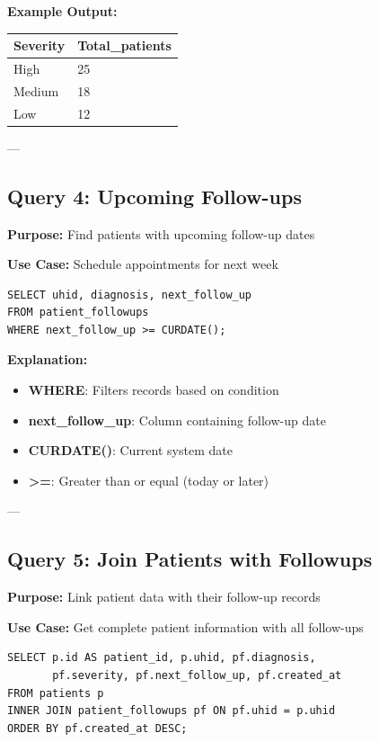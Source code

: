 \documentclass[12pt,a4paper]{article}
\begin{document}
\textbf{Example Output:}
\begin{table}[h]
\centering
\begin{tabular}{|l|l|}
\hline
\textbf{Severity} & \textbf{Total\_patients} \\
\hline
High & 25 \\
Medium & 18 \\
Low & 12 \\
\hline
\end{tabular}
\end{table}

---

\subsection{Query 4: Upcoming Follow-ups}

\textbf{Purpose:} Find patients with upcoming follow-up dates

\textbf{Use Case:} Schedule appointments for next week

\begin{lstlisting}[caption={Upcoming Patient Followups}]
SELECT uhid, diagnosis, next_follow_up
FROM patient_followups
WHERE next_follow_up >= CURDATE();
\end{lstlisting}

\textbf{Explanation:}
\begin{itemize}
    \item \textbf{WHERE}: Filters records based on condition
    \item \textbf{next\_follow\_up}: Column containing follow-up date
    \item \textbf{CURDATE()}: Current system date
    \item \textbf{>=}: Greater than or equal (today or later)
\end{itemize}

---

\subsection{Query 5: Join Patients with Followups}

\textbf{Purpose:} Link patient data with their follow-up records

\textbf{Use Case:} Get complete patient information with all follow-ups

\begin{lstlisting}[caption={Patient and Followup Information (JOIN)}]
SELECT p.id AS patient_id, p.uhid, pf.diagnosis, 
       pf.severity, pf.next_follow_up, pf.created_at
FROM patients p
INNER JOIN patient_followups pf ON pf.uhid = p.uhid
ORDER BY pf.created_at DESC;
\end{lstlisting}
\end{document}
